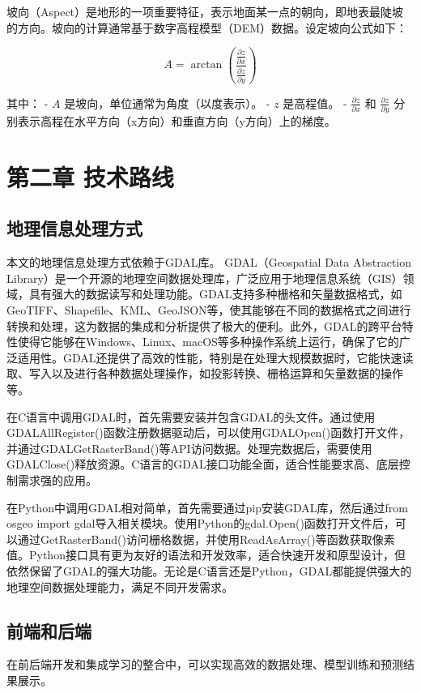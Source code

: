 \documentclass{article}
\begin{document}
		
		坡向（Aspect）是地形的一项重要特征，表示地面某一点的朝向，即地表最陡坡的方向。坡向的计算通常基于数字高程模型（DEM）数据。设定坡向公式如下：
		
		\[
		A = \arctan \left( \frac{ \frac{\partial z}{\partial x} }{ \frac{\partial z}{\partial y} } \right)
		\]
		
		其中：
		- \( A \) 是坡向，单位通常为角度（以度表示）。
		- \( z \) 是高程值。
		- \( \frac{\partial z}{\partial x} \) 和 \( \frac{\partial z}{\partial y} \) 分别表示高程在水平方向（x方向）和垂直方向（y方向）上的梯度。
		
		
	\section{第二章 技术路线}
	
	
	\subsection{地理信息处理方式}

	本文的地理信息处理方式依赖于GDAL库。
	GDAL（Geospatial Data Abstraction Library）是一个开源的地理空间数据处理库，广泛应用于地理信息系统（GIS）领域，具有强大的数据读写和处理功能。GDAL支持多种栅格和矢量数据格式，如GeoTIFF、Shapefile、KML、GeoJSON等，使其能够在不同的数据格式之间进行转换和处理，这为数据的集成和分析提供了极大的便利。此外，GDAL的跨平台特性使得它能够在Windows、Linux、macOS等多种操作系统上运行，确保了它的广泛适用性。GDAL还提供了高效的性能，特别是在处理大规模数据时，它能快速读取、写入以及进行各种数据处理操作，如投影转换、栅格运算和矢量数据的操作等。
	
	在C语言中调用GDAL时，首先需要安装并包含GDAL的头文件。通过使用GDALAllRegister()函数注册数据驱动后，可以使用GDALOpen()函数打开文件，并通过GDALGetRasterBand()等API访问数据。处理完数据后，需要使用GDALClose()释放资源。C语言的GDAL接口功能全面，适合性能要求高、底层控制需求强的应用。
	
	在Python中调用GDAL相对简单，首先需要通过pip安装GDAL库，然后通过from osgeo import gdal导入相关模块。使用Python的gdal.Open()函数打开文件后，可以通过GetRasterBand()访问栅格数据，并使用ReadAsArray()等函数获取像素值。Python接口具有更为友好的语法和开发效率，适合快速开发和原型设计，但依然保留了GDAL的强大功能。无论是C语言还是Python，GDAL都能提供强大的地理空间数据处理能力，满足不同开发需求。


	\subsection{前端和后端}
	在前后端开发和集成学习的整合中，可以实现高效的数据处理、模型训练和预测结果展示。
	
\end{document}
